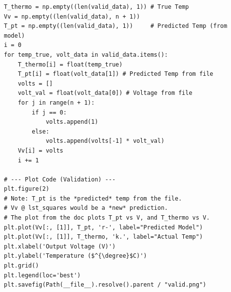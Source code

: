 \documentclass{article}
\begin{document}
\begin{lstlisting}[style=pythonstyle, caption={Python Code for Model Training and Validation}, label={lst:python}]
T_thermo = np.empty((len(valid_data), 1)) # True Temp
Vv = np.empty((len(valid_data), n + 1))
T_pt = np.empty((len(valid_data), 1))     # Predicted Temp (from model)
i = 0
for temp_true, volt_data in valid_data.items():
    T_thermo[i] = float(temp_true)
    T_pt[i] = float(volt_data[1]) # Predicted Temp from file
    volts = []
    volt_val = float(volt_data[0]) # Voltage from file
    for j in range(n + 1):
        if j == 0:
            volts.append(1)
        else:
            volts.append(volts[-1] * volt_val)
    Vv[i] = volts
    i += 1

# --- Plot Code (Validation) ---
plt.figure(2)
# Note: T_pt is the *predicted* temp from the file. 
# Vv @ lst_squares would be a *new* prediction.
# The plot from the doc plots T_pt vs V, and T_thermo vs V.
plt.plot(Vv[:, [1]], T_pt, 'r-', label="Predicted Model")
plt.plot(Vv[:, [1]], T_thermo, 'k.', label="Actual Temp")
plt.xlabel('Output Voltage (V)')
plt.ylabel('Temperature ($^{\degree}$C)')
plt.grid()
plt.legend(loc='best')
plt.savefig(Path(__file__).resolve().parent / "valid.png")
\end{lstlisting}

\newpage
\end{document}
